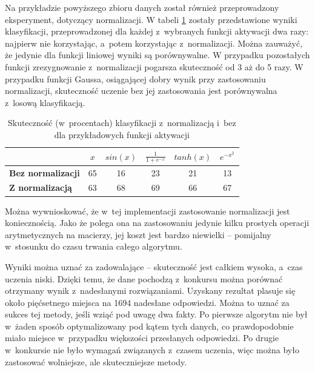 \documentclass[pl]{minipw} %
\begin{document}
Na przykładzie powyższego zbioru danych został również przeprowadzony eksperyment, dotyczący normalizacji.
W tabeli \ref{tab_norm} zostały przedstawione wyniki klasyfikacji, przeprowadzonej dla każdej z~wybranych funkcji aktywacji dwa razy: najpierw nie korzystając, a~potem korzystając z~normalizacji.
Można zauważyć, że jedynie dla funkcji liniowej wyniki są porównywalne.
W przypadku pozostałych funkcji zrezygnowanie z~normalizacji pogarsza skuteczność od 3 aż do 5 razy.
W przypadku funkcji Gaussa, osiągającej dobry wynik przy zastosowaniu normalizacji, skuteczność uczenie bez jej zastosowania jest porównywalna z~losową klasyfikacją.
\begin{table}[H]
\caption{Skuteczność (w~procentach) klasyfikacji z~normalizacją i~bez dla przykładowych funkcji aktywacji}
\label{tab_norm}
\begin{tabular}{|l|c|c|c|c|c|}
\hline
& $x$ & $sin(x)$ & $\frac{1}{1+e^{-x}}$ & $tanh(x)$ & $e^{-x^2}$ \\
\hline
\textbf{Bez normalizacji} & 65 & 16 & 23 & 21 & 13 \\
\hline
\textbf{Z normalizacją} & 63 & 68 & 69 & 66 & 67 \\
\hline

\hline
\end{tabular}
\end{table}
Można wywnioskować, że w~tej implementacji zastosowanie normalizacji jest koniecznością.
Jako że polega ona na zastosowaniu jedynie kilku prostych operacji arytmetycznych na macierzy, jej koszt jest bardzo niewielki -- pomijalny w~stosunku do czasu trwania całego algorytmu.

Wyniki można uznać za zadowalające -- skuteczność jest całkiem wysoka, a~czas uczenia niski.
Dzięki temu, że dane pochodzą z~konkursu można porównać otrzymany wynik z~nadesłanymi rozwiązaniami.
Uzyskany rezultat plasuje się około pięćsetnego miejsca na 1694 nadesłane odpowiedzi.
Można to uznać za sukces tej metody, jeśli wziąć pod uwagę dwa fakty.
Po pierwsze algorytm nie był w~żaden sposób optymalizowany pod kątem tych danych, co prawdopodobnie miało miejsce w~przypadku większości przesłanych odpowiedzi.
Po drugie w~konkursie nie było wymagań związanych z~czasem uczenia, więc można było zastosować wolniejsze, ale skuteczniejsze metody.
\end{document}
